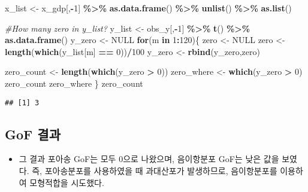 \documentclass[
]{article}
\newenvironment{Shaded}{\begin{snugshade}}{\end{snugshade}}
\newcommand{\CommentTok}[1]{\textcolor[rgb]{0.56,0.35,0.01}{\textit{#1}}}
\newcommand{\ControlFlowTok}[1]{\textcolor[rgb]{0.13,0.29,0.53}{\textbf{#1}}}
\newcommand{\DecValTok}[1]{\textcolor[rgb]{0.00,0.00,0.81}{#1}}
\newcommand{\KeywordTok}[1]{\textcolor[rgb]{0.13,0.29,0.53}{\textbf{#1}}}
\newcommand{\NormalTok}[1]{#1}
\newcommand{\OperatorTok}[1]{\textcolor[rgb]{0.81,0.36,0.00}{\textbf{#1}}}
\newcommand{\OtherTok}[1]{\textcolor[rgb]{0.56,0.35,0.01}{#1}}
\newcommand{\StringTok}[1]{\textcolor[rgb]{0.31,0.60,0.02}{#1}}
\providecommand{\tightlist}{%
  \setlength{\itemsep}{0pt}\setlength{\parskip}{0pt}}
\begin{document}
\begin{Shaded}
\begin{Highlighting}[]
\NormalTok{x\_list \textless{}{-}}\StringTok{ }\NormalTok{x\_gdp[,}\OperatorTok{{-}}\DecValTok{1}\NormalTok{] }\OperatorTok{\%\textgreater{}\%}\StringTok{ }\KeywordTok{as.data.frame}\NormalTok{() }\OperatorTok{\%\textgreater{}\%}\StringTok{ }\KeywordTok{unlist}\NormalTok{() }\OperatorTok{\%\textgreater{}\%}\StringTok{ }\KeywordTok{as.list}\NormalTok{()}

\CommentTok{\#How many zero in y\_list?}
\NormalTok{y\_list \textless{}{-}}\StringTok{ }\NormalTok{obs\_y[,}\OperatorTok{{-}}\DecValTok{1}\NormalTok{] }\OperatorTok{\%\textgreater{}\%}\StringTok{ }\KeywordTok{t}\NormalTok{() }\OperatorTok{\%\textgreater{}\%}\StringTok{ }\KeywordTok{as.data.frame}\NormalTok{()}
\NormalTok{y\_zero \textless{}{-}}\StringTok{ }\OtherTok{NULL}
\ControlFlowTok{for}\NormalTok{(m }\ControlFlowTok{in} \DecValTok{1}\OperatorTok{:}\DecValTok{120}\NormalTok{)\{}
\NormalTok{  zero \textless{}{-}}\StringTok{ }\OtherTok{NULL}
\NormalTok{  zero \textless{}{-}}\StringTok{ }\KeywordTok{length}\NormalTok{(}\KeywordTok{which}\NormalTok{(y\_list[m] }\OperatorTok{==}\StringTok{ }\DecValTok{0}\NormalTok{))}\OperatorTok{/}\DecValTok{100}
\NormalTok{  y\_zero \textless{}{-}}\StringTok{ }\KeywordTok{rbind}\NormalTok{(y\_zero,zero)}

\NormalTok{  zero\_count \textless{}{-}}\StringTok{ }\KeywordTok{length}\NormalTok{(}\KeywordTok{which}\NormalTok{(y\_zero }\OperatorTok{\textgreater{}}\StringTok{ }\DecValTok{0}\NormalTok{))}
\NormalTok{  zero\_where \textless{}{-}}\StringTok{ }\KeywordTok{which}\NormalTok{(y\_zero }\OperatorTok{\textgreater{}}\StringTok{ }\DecValTok{0}\NormalTok{)}
\NormalTok{  zero\_count}
\NormalTok{  zero\_where}
\NormalTok{\}}
\NormalTok{zero\_count}
\end{Highlighting}
\end{Shaded}

\begin{verbatim}
## [1] 3
\end{verbatim}

\newpage

\hypertarget{gof-uxacb0uxacfc}{%
\subsection{GoF 결과}\label{gof-uxacb0uxacfc}}

\begin{itemize}
\tightlist
\item
  그 결과 포아송 GoF는 모두 0으로 나왔으며, 음이항분포 GoF는 낮은 값을 보였다. 즉, 포아송분포를 사용하였을 때 과대산포가 발생하므로, 음이항분포를 이용하여 모형적합을 시도했다.
\end{itemize}
\end{document}
